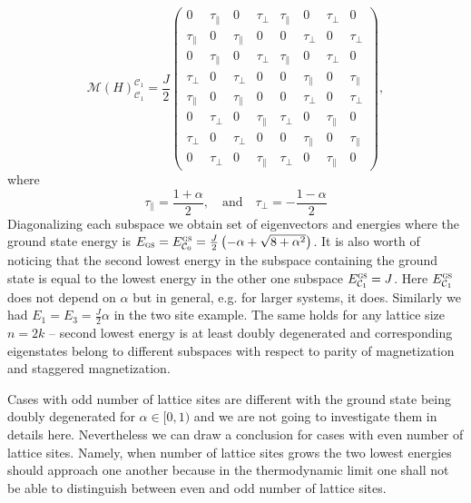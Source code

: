 \documentclass[12pt, a4paper]{article}
\begin{document}
\begin{equation}
\mathcal{M}(H)_{\mathcal{C}_1}^{\mathcal{C}_1} = \frac{J}{2} \begin{pmatrix}
0 & \tau_{\parallel} & 0 & \tau_{\perp} & \tau_{\parallel} & 0 & \tau_{\perp} & 0 \\
\tau_{\parallel} & 0 & \tau_{\parallel} & 0 & 0 & \tau_{\perp}  & 0 & \tau_{\perp}\\
0 & \tau_{\parallel}  & 0 & \tau_{\perp} & \tau_{\parallel}  & 0 & \tau_{\perp}  & 0 \\
\tau_{\perp}& 0 & \tau_{\perp} & 0 & 0 & \tau_{\parallel}  & 0 & \tau_{\parallel} \\
\tau_{\parallel}& 0 & \tau_{\parallel} & 0 & 0 & \tau_{\perp}  & 0 & \tau_{\perp} \\
0 & \tau_{\perp}  & 0 & \tau_{\parallel} & \tau_{\perp}  & 0 & \tau_{\parallel}  & 0 \\
\tau_{\perp} & 0 & \tau_{\perp} & 0 & 0 & \tau_{\parallel}  & 0 & \tau_{\parallel}\\
0 & \tau_{\perp} & 0 & \tau_{\parallel} & \tau_{\perp} & 0 & \tau_{\parallel} & 0
\end{pmatrix},
\end{equation}
where
\begin{equation}\label{eq:tau_def}
\tau_{\parallel} = \frac{1+\alpha}{2}, \quad \text{and} \quad \tau_{\perp} = -\frac{1-\alpha}{2}
\end{equation}
Diagonalizing each subspace we obtain set of eigenvectors and energies where the ground state energy is $E_\textsc{gs} = E^\textsc{gs}_{\mathcal{C}_0} = \frac{J}{2}\left(-\alpha + \sqrt{8 + \alpha^2}\right)$. It is also worth of noticing that the second lowest energy in the subspace containing the ground state is equal to the lowest energy in the other one subspace $E^{\textsc{gs}}_{\mathcal{C}_1} = J$. Here $E^{\textsc{gs}}_{\mathcal{C}_1}$ does not depend on $\alpha$ but in general, e.g. for larger systems, it does. Similarly we had $E_1 = E_3 = \frac{J}{2}\alpha$ in the two site example. The same holds for any lattice size $n = 2k$ -- second lowest energy is at least doubly degenerated and corresponding eigenstates belong to different subspaces with respect to parity of magnetization and staggered magnetization. 

Cases with odd number of lattice sites are different with the ground state being doubly degenerated for $\alpha \in [0, 1)$ and we are not going to investigate them in details here. Nevertheless we can draw a conclusion for cases with even number of lattice sites. Namely, when number of lattice sites grows the two lowest energies should approach one another because in the thermodynamic limit one shall not be able to distinguish between even and odd number of lattice sites.
\end{document}
